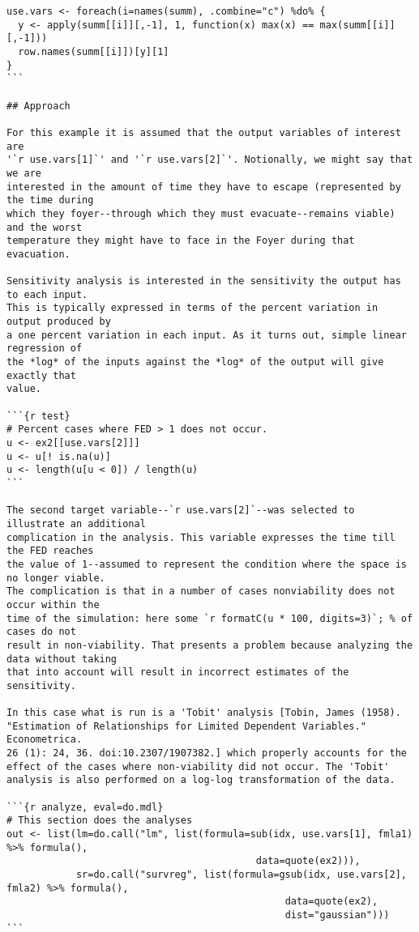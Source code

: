 \begin{lstlisting}[basicstyle=\scriptsize]
use.vars <- foreach(i=names(summ), .combine="c") %do% {
  y <- apply(summ[[i]][,-1], 1, function(x) max(x) == max(summ[[i]][,-1]))
  row.names(summ[[i]])[y][1]
}
```

## Approach

For this example it is assumed that the output variables of interest are
'`r use.vars[1]`' and '`r use.vars[2]`'. Notionally, we might say that we are
interested in the amount of time they have to escape (represented by the time during
which they foyer--through which they must evacuate--remains viable) and the worst
temperature they might have to face in the Foyer during that evacuation.

Sensitivity analysis is interested in the sensitivity the output has to each input.
This is typically expressed in terms of the percent variation in output produced by
a one percent variation in each input. As it turns out, simple linear regression of
the *log* of the inputs against the *log* of the output will give exactly that
value.

```{r test}
# Percent cases where FED > 1 does not occur.
u <- ex2[[use.vars[2]]]
u <- u[! is.na(u)]
u <- length(u[u < 0]) / length(u)
```

The second target variable--`r use.vars[2]`--was selected to illustrate an additional
complication in the analysis. This variable expresses the time till the FED reaches
the value of 1--assumed to represent the condition where the space is no longer viable.
The complication is that in a number of cases nonviability does not occur within the
time of the simulation: here some `r formatC(u * 100, digits=3)`; % of cases do not
result in non-viability. That presents a problem because analyzing the data without taking
that into account will result in incorrect estimates of the sensitivity.

In this case what is run is a 'Tobit' analysis [Tobin, James (1958). "Estimation of Relationships for Limited Dependent Variables." Econometrica.
26 (1): 24, 36. doi:10.2307/1907382.] which properly accounts for the effect of the cases where non-viability did not occur. The 'Tobit'
analysis is also performed on a log-log transformation of the data.

```{r analyze, eval=do.mdl}
# This section does the analyses
out <- list(lm=do.call("lm", list(formula=sub(idx, use.vars[1], fmla1) %>% formula(),
                                           data=quote(ex2))),
            sr=do.call("survreg", list(formula=gsub(idx, use.vars[2], fmla2) %>% formula(),
                                                data=quote(ex2),
                                                dist="gaussian")))
```


\end{lstlisting}
